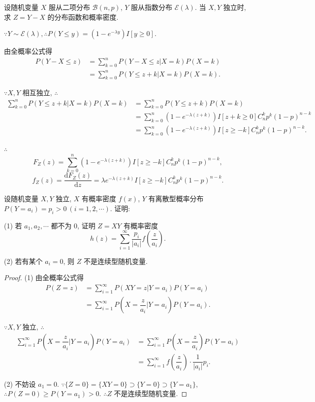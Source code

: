 \documentclass[color=black,device=normal,lang=cn]{elegantnote}
\numberwithin{equation}{section}
\theoremstyle{plain}
\numberwithin{exercise}{exsection}
\begin{document}
\begin{exercise}%
    设随机变量 $X$ 服从二项分布 $\mathcal{B}(n,p)$, $Y$ 服从指数分布 $\mathcal{E}(\lambda)$. 当 $X,Y$ 独立时, 求 $Z=Y-X$ 的分布函数和概率密度.
\end{exercise}
\begin{solution}
    $\because Y\sim\mathcal{E}(\lambda),\therefore P(Y\leq y)=(1-e^{-\lambda y})I[y\geq0]$.
    
    由全概率公式得
    \begin{align*}
        P(Y-X\leq z) & =\sum\limits_{k=0}^nP(Y-X\leq z|X=k)P(X=k) \\
        & =\sum\limits_{k=0}^nP(Y\leq z+k|X=k)P(X=k).
    \end{align*}

    $\because X,Y$ 相互独立, $\therefore$
    \begin{align*}
        \sum\limits_{k=0}^nP(Y\leq z+k|X=k)P(X=k) & =\sum\limits_{k=0}^nP(Y\leq z+k)P(X=k) \\
        & =\sum\limits_{k=0}^n(1-e^{-\lambda(z+k)})I[z+k\geq0]C_n^kp^k(1-p)^{n-k} \\
        & =\sum\limits_{k=0}^n(1-e^{-\lambda(z+k)})I[z\geq-k]C_n^kp^k(1-p)^{n-k}.
    \end{align*}

    $\therefore$
    \[F_Z(z)=\sum\limits_{k=0}^n(1-e^{-\lambda(z+k)})I[z\geq-k]C_n^kp^k(1-p)^{n-k},\]
    \[f_Z(z)=\dfrac{\mathrm{d}F_Z(z)}{\mathrm{d}z}=\lambda e^{-\lambda(z+k)}I[z\geq-k]C_n^kp^k(1-p)^{n-k}.\]
\end{solution}
\addtocounter{exercise}{2}
\begin{exercise}%
    设随机变量 $X,Y$ 独立, $X$ 有概率密度 $f(x)$, $Y$ 有离散型概率分布 $P(Y=a_i)=p_i>0\ (i=1,2,\cdots)$. 证明:
    
    (1) 若 $a_1,a_2,\cdots$ 都不为 $0$, 证明 $Z=XY$ 有概率密度
    \[h(z)=\sum\limits_{i=1}^\infty\dfrac{p_i}{|a_i|}f\left(\dfrac{z}{a_i}\right).\]

    (2) 若有某个 $a_i=0$, 则 $Z$ 不是连续型随机变量.
\end{exercise}
\begin{proof}
    (1) 由全概率公式得
    \begin{align*}
        P(Z=z) & =\sum\limits_{i=1}^\infty P(XY=z|Y=a_i)P(Y=a_i) \\
        & =\sum\limits_{i=1}^\infty P\left(X=\dfrac{z}{a_i}\Big|Y=a_i\right)P(Y=a_i).
    \end{align*}

    $\because X,Y$ 独立, $\therefore$
    \begin{align*}
        \sum\limits_{i=1}^\infty P\left(X=\dfrac{z}{a_i}\Big|Y=a_i\right)P(Y=a_i) & =\sum\limits_{i=1}^\infty P\left(X=\dfrac{z}{a_i}\right)P(Y=a_i) \\
        & =\sum\limits_{i=1}^\infty f\left(\dfrac{z}{a_i}\right)\cdot\dfrac{1}{|a_i|}p_i.
    \end{align*}

    (2) 不妨设 $a_1=0$. $\because\{Z=0\}=\{XY=0\}\supset\{Y=0\}\supset\{Y=a_1\}$, $\therefore P(Z=0)\geq P(Y=a_1)>0$. $\therefore Z$ 不是连续型随机变量.
\end{proof}
\end{document}
